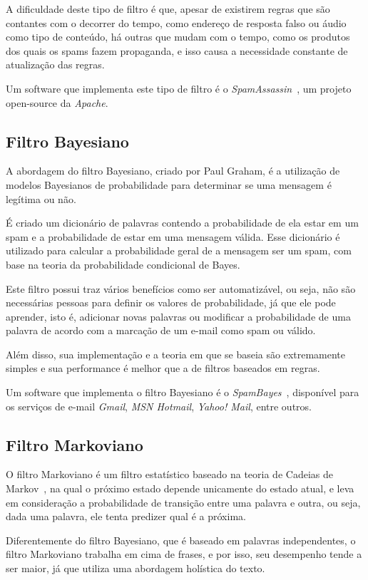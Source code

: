 \documentclass[a4paper,dvipdfm]{article}
\begin{document}
\begin{description}
		A dificuldade deste tipo de filtro é que, apesar de existirem regras que são contantes com o decorrer do tempo, como endereço de resposta falso ou áudio como tipo de conteúdo, há outras que mudam com o tempo, como os produtos dos quais os spams fazem propaganda, e isso causa a necessidade constante de atualização das regras.

		Um software que implementa este tipo de filtro é o \emph{SpamAssassin}~\cite{spamassassin}, um projeto open-source da \emph{Apache}.

	\subsection{Filtro Bayesiano}
		A abordagem do filtro Bayesiano, criado por Paul Graham, é a utilização de modelos Bayesianos de probabilidade para determinar se uma mensagem é legítima ou não.

		É criado um dicionário de palavras contendo a probabilidade de ela estar em um spam e a probabilidade de estar em uma mensagem válida. Esse dicionário é utilizado para calcular a probabilidade geral de a mensagem ser um spam, com base na teoria da probabilidade condicional de Bayes.

		Este filtro possui traz vários benefícios como ser automatizável, ou seja, não são necessárias pessoas para definir os valores de probabilidade, já que ele pode aprender, isto é, adicionar novas palavras ou modificar a probabilidade de uma palavra de acordo com a marcação de um e-mail como spam ou válido.

		Além disso, sua implementação e a teoria em que se baseia são extremamente simples e sua performance é melhor que a de filtros baseados em regras.
		
		Um software que implementa o filtro Bayesiano é o \emph{SpamBayes}~\cite{spambayes}, disponível para os serviços de e-mail \emph{Gmail}, \emph{MSN Hotmail}, \emph{Yahoo! Mail}, entre outros.

	\subsection{Filtro Markoviano}
		O filtro Markoviano é um filtro estatístico baseado na teoria de Cadeias de Markov~\cite{markov}, na qual o próximo estado depende unicamente do estado atual, e leva em consideração a probabilidade de transição entre uma palavra e outra, ou seja, dada uma palavra, ele tenta predizer qual é a próxima.

		Diferentemente do filtro Bayesiano, que é baseado em palavras independentes, o filtro Markoviano trabalha em cima de frases, e por isso, seu desempenho tende a ser maior, já que utiliza uma abordagem holística do texto.
		

\end{description}
\end{document}
